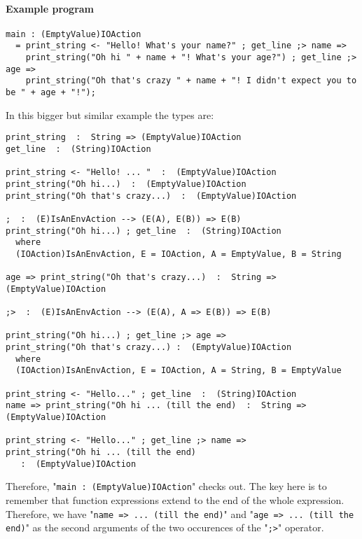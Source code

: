 \documentclass{article}
\begin{document}
\paragraph{Example program}
\begin{verbatim}
main : (EmptyValue)IOAction
  = print_string <- "Hello! What's your name?" ; get_line ;> name =>
    print_string("Oh hi " + name + "! What's your age?") ; get_line ;> age =>
    print_string("Oh that's crazy " + name + "! I didn't expect you to be " + age + "!");
\end{verbatim}
In this bigger but similar example the types are:
\begin{verbatim}
print_string  :  String => (EmptyValue)IOAction
get_line  :  (String)IOAction

print_string <- "Hello! ... "  :  (EmptyValue)IOAction
print_string("Oh hi...)  :  (EmptyValue)IOAction
print_string("Oh that's crazy...)  :  (EmptyValue)IOAction

;  :  (E)IsAnEnvAction --> (E(A), E(B)) => E(B) 
print_string("Oh hi...) ; get_line  :  (String)IOAction
  where
  (IOAction)IsAnEnvAction, E = IOAction, A = EmptyValue, B = String

age => print_string("Oh that's crazy...)  :  String => (EmptyValue)IOAction

;>  :  (E)IsAnEnvAction --> (E(A), A => E(B)) => E(B) 

print_string("Oh hi...) ; get_line ;> age =>
print_string("Oh that's crazy...) :  (EmptyValue)IOAction
  where
  (IOAction)IsAnEnvAction, E = IOAction, A = String, B = EmptyValue

print_string <- "Hello..." ; get_line  :  (String)IOAction
name => print_string("Oh hi ... (till the end)  :  String => (EmptyValue)IOAction

print_string <- "Hello..." ; get_line ;> name =>
print_string("Oh hi ... (till the end)
   :  (EmptyValue)IOAction
\end{verbatim}
Therefore, "\texttt{main\ :\ (EmptyValue)IOAction}" checks out.  The key here is
to remember that function expressions extend to the end of the whole
expression. Therefore, we have "\texttt{name => ... (till the end)}" and
"\texttt{age => ... (till the end)}" as the second arguments of the two
occurences of the "\texttt{;>}" operator. 
\end{document}
